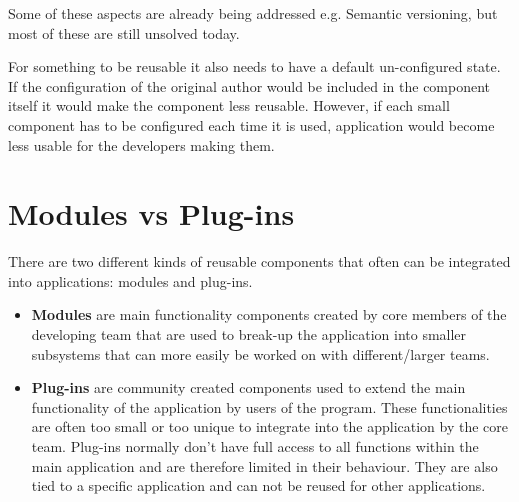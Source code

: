 Some of these aspects are already being addressed e.g. Semantic versioning, but most of these are still unsolved today.

For something to be reusable it also needs to have a default un-configured state. If the configuration of the original author would be included in the component itself it would make the component less reusable. However, if each small component has to be configured each time it is used, application would become less usable for the developers making them.

%

\section{Modules vs Plug-ins}

There are two different kinds of reusable components that often can be integrated into applications: modules and plug-ins.

\begin{itemize}
	\item \textbf{Modules} are main functionality components created by core members of the developing team that are used to break-up the application into smaller subsystems that can more easily be worked on with different/larger teams.
	\item \textbf{Plug-ins} are  community created components used to extend the main functionality of the application by users of the program. These functionalities are often too small or too unique to integrate into the application by the core team. Plug-ins normally don't have full access to all functions within the main application and are therefore limited in their behaviour. They are also tied to a specific application and can not be reused for other applications.
\end{itemize}

